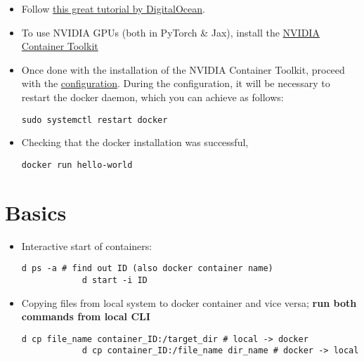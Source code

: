 \documentclass[12pt, a4paper]{scrbook}
\numberwithin{equation}{section}
\theoremstyle{definition}
\theoremstyle{definition}
\begin{document}
	\begin{itemize}
		\item Follow  \href{https://www.digitalocean.com/community/tutorials/how-to-install-and-use-docker-on-ubuntu-20-04}{this great tutorial by DigitalOcean}.
		
		\item To use NVIDIA GPUs (both in PyTorch \& Jax), install the \href{https://docs.nvidia.com/datacenter/cloud-native/container-toolkit/latest/install-guide.html#installing-with-apt}{NVIDIA Container Toolkit}
		
		\item Once done with the installation of the NVIDIA Container Toolkit, proceed with the \href{https://docs.nvidia.com/datacenter/cloud-native/container-toolkit/latest/install-guide.html#configuring-docker}{configuration}. During the configuration, it will be necessary to restart the docker daemon, which you can achieve as follows: 
		
		\begin{lstlisting}[style=mystylebash, xleftmargin=\parindent]
			sudo systemctl restart docker
		\end{lstlisting}
	
		\item Checking that the docker installation was successful, 
		
		\begin{lstlisting}[style=mystylebash, xleftmargin=\parindent]
			docker run hello-world
		\end{lstlisting}
		
	\end{itemize}
	
	\section{Basics}
	
	\begin{itemize} 
		\item Interactive start of containers: 
		
		\begin{lstlisting}[style=mystylebash, label=alg:docker_id, xleftmargin=\parindent]
			d ps -a # find out ID (also docker container name)
			d start -i ID
		\end{lstlisting}
		
		\item Copying files from local system to docker container and vice versa; \textbf{run both commands from local CLI}
		
		\begin{lstlisting}[style=mystylebash, label=alg:docker_cp, xleftmargin=\parindent]
			d cp file_name container_ID:/target_dir # local -> docker
			d cp container_ID:/file_name dir_name # docker -> local
		\end{lstlisting}
		
	\end{itemize}
	
\end{document}
